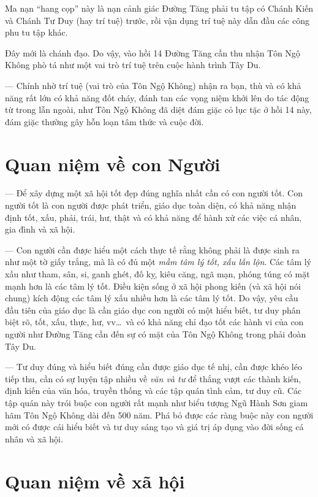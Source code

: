 Ma nạn ``hang cọp'' này là nạn cảnh giác Đường Tăng phải tu tập có Chánh Kiến và Chánh Tư Duy (hay trí tuệ) trước, rồi vận dụng trí tuệ này dẫn đầu các công phu tu tập khác.

Đây mới là chánh đạo. Do vậy, vào hồi 14 Đường Tăng cần thu nhận Tôn Ngộ Không phò tá như một vai trò trí tuệ trên cuộc hành trình Tây Du.

— Chính nhờ trí tuệ (vai trò của Tôn Ngộ Không) nhận ra bạn, thù và có khả năng rất lớn có khả năng đốt cháy, đánh tan các vọng niệm khởi lên do tác động từ trong lẫn ngoài, như Tôn Ngộ Không đã diệt đám giặc cỏ lục tặc ở hồi 14 này, đám giặc thường gây hỗn loạn tâm thức và cuộc đời.

\section{Quan niệm về con Người} %
\label{sec:13_con_nguoi}

— Để xây dựng một xã hội tốt đẹp đúng nghĩa nhất cần có con người tốt. Con người tốt là con người được phát triển, giáo dục toàn diện, có khả năng nhận định tốt, xấu, phải, trái, hư, thật và có khả năng để hành xử các việc cá nhân, gia đình và xã hội.

— Con người cần được hiểu một cách thực tế rằng không phải là được sinh ra như một tờ giấy trắng, mà là có đủ một \emph{mầm tâm lý tốt, xấu lẫn lộn}. Các tâm lý xấu như tham, sân, si, ganh ghét, đố kỵ, kiêu căng, ngã mạn, phóng túng có mặt mạnh hơn là các tâm lý tốt. Điều kiện sống ở xã hội phong kiến (và xã hội nói chung) kích động các tâm lý xấu nhiều hơn là các tâm lý tốt. Do vậy, yêu cầu đầu tiên của giáo dục là cần giáo dục con người có một hiểu biết, tư duy phân biệt rõ, tốt, xấu, thực, hư, vv\ldots ~và có khả năng chỉ đạo tốt các hành vi của con người như Đường Tăng cần đến sự có mặt của Tôn Ngộ Không trong phải đoàn Tây Du.

— Tư duy đúng và hiểu biết đúng cần được giáo dục tế nhị, cần được khéo léo tiếp thu, cần có sự luyện tập nhiều về \emph{văn và tư} để thắng vượt các thành kiến, định kiến của văn hóa, truyền thống và các tập quán tình cảm, tư duy cũ. Các tập quán này trói buộc con người rất mạnh như biểu tượng Ngũ Hành Sơn giam hãm Tôn Ngộ Không dài đến 500 năm. Phá bỏ được các ràng buộc này con người mới có được cái hiểu biết và tư duy sáng tạo và giá trị áp dụng vào đời sống cá nhân và xã hội.

\section{Quan niệm về xã hội} %
\label{sec:13_xa_hoi}

